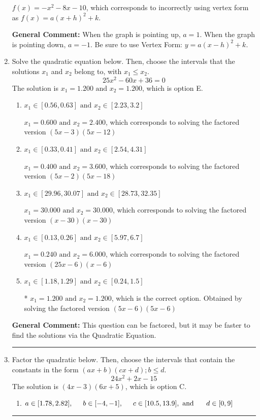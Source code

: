 \documentclass{extbook}[14pt]
\newcommand{\litem}[1]{\item #1

\rule{\textwidth}{0.4pt}}
\begin{document}
\begin{enumerate}
{\begin{enumerate}[label=\Alph*.]
$f(x)=-x^{2} -8 x -10$, which corresponds to incorrectly using vertex form as $f(x) = a(x+h)^2+k$.
\end{enumerate}

\textbf{General Comment:} When the graph is pointing up, $a=1$. When the graph is pointing down, $a=-1$. Be sure to use Vertex Form: $y = a(x-h)^2+k$.
}
\litem{
Solve the quadratic equation below. Then, choose the intervals that the solutions $x_1$ and $x_2$ belong to, with $x_1 \leq x_2$.
\[ 25x^{2} -60 x + 36 = 0 \]
The solution is \( x_1 = 1.200 \text{ and } x_2 = 1.200 \), which is option E.\begin{enumerate}[label=\Alph*.]
\item \( x_1 \in [0.56, 0.63] \text{ and } x_2 \in [2.23, 3.2] \)

$x_1 = 0.600 \text{ and } x_2 = 2.400$, which corresponds to solving the factored version $(5x -3)(5x -12)$
\item \( x_1 \in [0.33, 0.41] \text{ and } x_2 \in [2.54, 4.31] \)

$x_1 = 0.400 \text{ and } x_2 = 3.600$, which corresponds to solving the factored version $(5x -2)(5x -18)$
\item \( x_1 \in [29.96, 30.07] \text{ and } x_2 \in [28.73, 32.35] \)

$x_1 = 30.000 \text{ and } x_2 = 30.000$, which corresponds to solving the factored version $(x -30)(x -30)$
\item \( x_1 \in [0.13, 0.26] \text{ and } x_2 \in [5.97, 6.7] \)

$x_1 = 0.240 \text{ and } x_2 = 6.000$, which corresponds to solving the factored version $(25x -6)(x -6)$
\item \( x_1 \in [1.18, 1.29] \text{ and } x_2 \in [0.24, 1.5] \)

* $x_1 = 1.200 \text{ and } x_2 = 1.200$, which is the correct option. Obtained by solving the factored version $(5x -6)(5x -6)$
\end{enumerate}

\textbf{General Comment:} This question can be factored, but it may be faster to find the solutions via the Quadratic Equation.
}
\litem{
Factor the quadratic below. Then, choose the intervals that contain the constants in the form $(ax+b)(cx+d); b \leq d.$
\[ 24x^{2} +2 x -15 \]
The solution is \( (4x -3)(6x + 5) \), which is option C.\begin{enumerate}[label=\Alph*.]
\item \( a \in [1.78, 2.82], \hspace*{5mm} b \in [-4, -1], \hspace*{5mm} c \in [10.5, 13.9], \text{ and } \hspace*{5mm} d \in [0, 9] \)


\end{enumerate}}
\end{enumerate}
\end{document}
